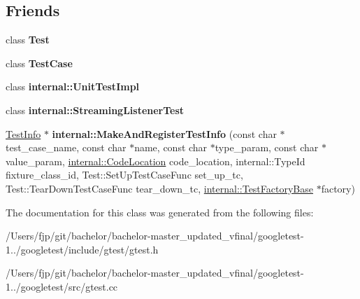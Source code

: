 \subsection*{Friends}
\begin{DoxyCompactItemize}
\item 
\mbox{\label{classtesting_1_1_test_info_a5b78b1c2e1fa07ffed92da365593eaa4}} 
class {\bfseries Test}
\item 
\mbox{\label{classtesting_1_1_test_info_aff779e55b06adfa7c0088bd10253f0f0}} 
class {\bfseries Test\+Case}
\item 
\mbox{\label{classtesting_1_1_test_info_acc0a5e7573fd6ae7ad1878613bb86853}} 
class {\bfseries internal\+::\+Unit\+Test\+Impl}
\item 
\mbox{\label{classtesting_1_1_test_info_adc037d188dab349a94868991955c9cd4}} 
class {\bfseries internal\+::\+Streaming\+Listener\+Test}
\item 
\mbox{\label{classtesting_1_1_test_info_a70ddf8a12d8c05f17429f6381abc8ace}} 
\mbox{\hyperlink{classtesting_1_1_test_info}{Test\+Info}} $\ast$ {\bfseries internal\+::\+Make\+And\+Register\+Test\+Info} (const char $\ast$test\+\_\+case\+\_\+name, const char $\ast$name, const char $\ast$type\+\_\+param, const char $\ast$value\+\_\+param, \mbox{\hyperlink{structtesting_1_1internal_1_1_code_location}{internal\+::\+Code\+Location}} code\+\_\+location, internal\+::\+Type\+Id fixture\+\_\+class\+\_\+id, Test\+::\+Set\+Up\+Test\+Case\+Func set\+\_\+up\+\_\+tc, Test\+::\+Tear\+Down\+Test\+Case\+Func tear\+\_\+down\+\_\+tc, \mbox{\hyperlink{classtesting_1_1internal_1_1_test_factory_base}{internal\+::\+Test\+Factory\+Base}} $\ast$factory)
\end{DoxyCompactItemize}


The documentation for this class was generated from the following files\+:\begin{DoxyCompactItemize}
\item 
/\+Users/fjp/git/bachelor/bachelor-\/master\+\_\+updated\+\_\+vfinal/googletest-\/1../googletest/include/gtest/gtest.\+h\item 
/\+Users/fjp/git/bachelor/bachelor-\/master\+\_\+updated\+\_\+vfinal/googletest-\/1../googletest/src/gtest.\+cc\end{DoxyCompactItemize}
